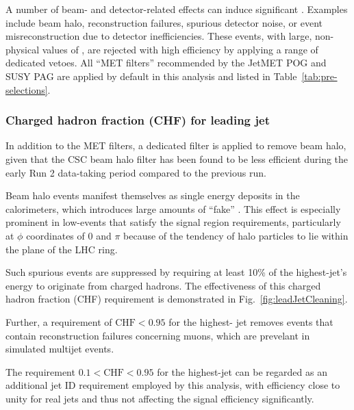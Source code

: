 A number of beam- and detector-related effects can induce significant
\met. Examples include beam halo, reconstruction failures, spurious
detector noise, or event misreconstruction due to detector
inefficiencies. These events, with large, non-physical values of \met,
are rejected with high efficiency by applying a range of dedicated
vetoes. All ``MET filters'' recommended by the JetMET POG and SUSY PAG
are applied by default in this analysis and listed in
Table~\ref{tab:pre-selections}.

\subsubsection{Charged hadron fraction (CHF) for leading jet}

In addition to the MET filters, a dedicated filter is applied to
remove beam halo, given that the CSC beam halo filter has been found
to be less efficient during the early Run 2 data-taking period
compared to the previous run.

Beam halo events manifest themselves as single energy deposits in the
calorimeters, which introduces large amounts of ``fake'' \met. This
effect is especially prominent in low-\njet events that satisfy the
signal region requirements, particularly at $\phi$ coordinates of 0
and $\pi$ because of the tendency of halo particles to lie within the
plane of the LHC ring.

Such spurious events are suppressed by requiring at least 10\% of 
the highest-\Pt jet's energy to originate from charged
hadrons. The effectiveness of this charged hadron fraction (CHF)
requirement is demonstrated in Fig.~\ref{fig:leadJetCleaning}.

Further, a requirement of $\mathrm{CHF} < 0.95$ for the highest-\Pt
jet removes events that contain reconstruction failures concerning
muons, which are prevelant in simulated multijet events.


The requirement $0.1 < \mathrm{CHF} < 0.95$ for the highest-\Pt jet
can be regarded as an additional jet ID requirement employed by this
analysis, with efficiency close to unity for real jets and thus not
affecting the signal efficiency significantly.

